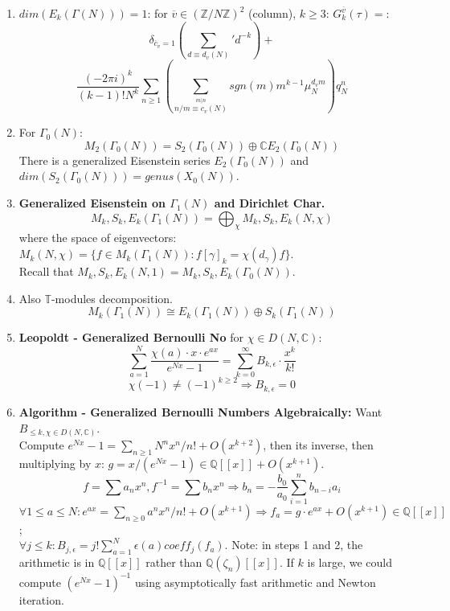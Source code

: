 \documentclass{article}
\newcommand{\Q}{\mathbb{Q}}
\newcommand{\C}{\mathbb{C}}
\newcommand{\Z}{\mathbb{Z}}
\newcommand{\Ra}{\Rightarrow}
\begin{document}
\begin{multicols}{2}
\begin{enumerate}
\item  $dim(E_k(\Gamma(N))) = 1$: for $\overline{v} \in (\Z/N\Z)^2$ (column), $k \geq 3$: $G_k^{\overline{v}}(\tau) =$:
\[\delta_{\overline{c}_v=1} \left(\sum_{d \equiv d_v(N)}' d^{-k}\right) +\]\[ \frac{(-2\pi i)^k}{(k-1)!N^k} \sum_{n \geq 1}  \left(\sum_{\overset{m|n}{n/m \equiv c_v (N)}} sgn(m)m^{k-1}\mu^{d_vm}_N\right) q_N^n\]

\item For $\Gamma_0(N)$: 
\[M_2(\Gamma_0(N)) = S_2(\Gamma_0(N)) \oplus \C E_2(\Gamma_0(N))\] 
There is a generalized Eisenstein series $E_2(\Gamma_0(N))$ and
$dim(S_2(\Gamma_0(N))) = genus(X_0(N))$.

\item \textbf{Generalized Eisenstein on $\Gamma_1(N)$ and Dirichlet Char.} 
\[M_k,S_k,E_k(\Gamma_1(N)) = \bigoplus_\chi M_k,S_k,E_k(N,\chi)\]
where the space of eigenvectors: $M_k(N,\chi) = \{f \in M_k(\Gamma_1(N)): f[\gamma]_k = \chi(d_\gamma)f\}$.\\
Recall that $M_k,S_k,E_k(N,1) = M_k,S_k,E_k(\Gamma_0(N))$. 




\item Also $\mathbb{T}$-modules decomposition. 
\[M_k(\Gamma_1(N)) \cong E_k(\Gamma_1(N)) \oplus S_k(\Gamma_1(N))\] 
  
\item \textbf{Leopoldt - Generalized Bernoulli No} for $\chi \in D(N,\C)$:
\[\sum_{a = 1}^N \frac{\chi(a)\cdot x \cdot e^{ax}}{e^{Nx} - 1} = \sum_{k=0}^\infty B_{k,\epsilon} \cdot \frac{x^k}{k!}\]
\[\chi(-1) \neq (-1)^{k \geq 2} \Ra B_{k,\epsilon} = 0\]

\item \textbf{Algorithm - Generalized Bernoulli Numbers Algebraically:}  Want $B_{\leq k, \chi \in D(N,\C)}$.\\
Compute $e^{Nx} - 1 = \sum_{n \geq 1} N^n x^n/n!+O(x^{k+2})$, then its inverse, then multiplying by $x$: $g = x/(e^{Nx} - 1) \in \Q[[x]] + O(x^{k+1})$. 
\[f = \sum a_nx^n, f^{-1} = \sum b_n x^n \Ra b_n = -\frac{b_0}{a_0}\sum_{i=1}^{n}b_{n-i}a_i\]
$\forall 1 \leq a \leq N: e^{ax} = \sum_{n \geq 0} a^nx^n/n! + O(x^{k+1}) \Ra  f_a = g \cdot e^{ax} + O(x^{k+1})\in \Q[[x]]$;\\
$\forall j \leq k: B_{j,\epsilon} = j! \sum_{a=1}^N \epsilon(a) coeff_j(f_a)$.
Note: in steps 1 and 2, the arithmetic is in $\Q[[x]]$ rather than $\Q(\zeta_n)[[x]]$. If $k$ is large, we could compute $(e^{Nx}-1)^{-1}$ using asymptotically fast arithmetic and Newton iteration.


\end{enumerate}
\end{multicols}
\end{document}
